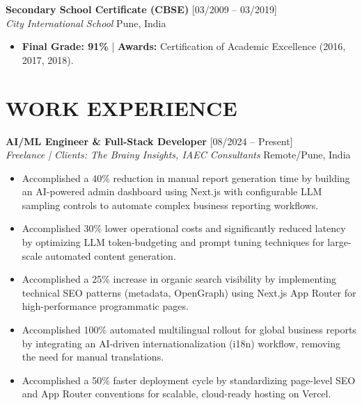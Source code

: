 \documentclass[a4paper,10pt]{article}
\begin{document}
\vspace{4pt}
\noindent
\textbf{Secondary School Certificate (CBSE)} \hfill [03/2009 – 03/2019] \\
\textit{City International School} \hfill Pune, India
\begin{itemize}
    \item \textbf{Final Grade: 91\%} | \textbf{Awards:} Certification of Academic Excellence (2016, 2017, 2018).
\end{itemize}

\section{WORK EXPERIENCE}

\noindent
\textbf{AI/ML Engineer \& Full-Stack Developer} \hfill [08/2024 – Present] \\
\textit{Freelance | Clients: The Brainy Insights, IAEC Consultants} \hfill Remote/Pune, India
\begin{itemize}
    \item Accomplished a 40\% reduction in manual report generation time by building an AI-powered admin dashboard using Next.js with configurable LLM sampling controls to automate complex business reporting workflows.
    \item Accomplished 30\% lower operational costs and significantly reduced latency by optimizing LLM token-budgeting and prompt tuning techniques for large-scale automated content generation.
    \item Accomplished a 25\% increase in organic search visibility by implementing technical SEO patterns (metadata, OpenGraph) using Next.js App Router for high-performance programmatic pages.
    \item Accomplished 100\% automated multilingual rollout for global business reports by integrating an AI-driven internationalization (i18n) workflow, removing the need for manual translations.
    \item Accomplished a 50\% faster deployment cycle by standardizing page-level SEO and App Router conventions for scalable, cloud-ready hosting on Vercel.
\end{itemize}
\end{document}
